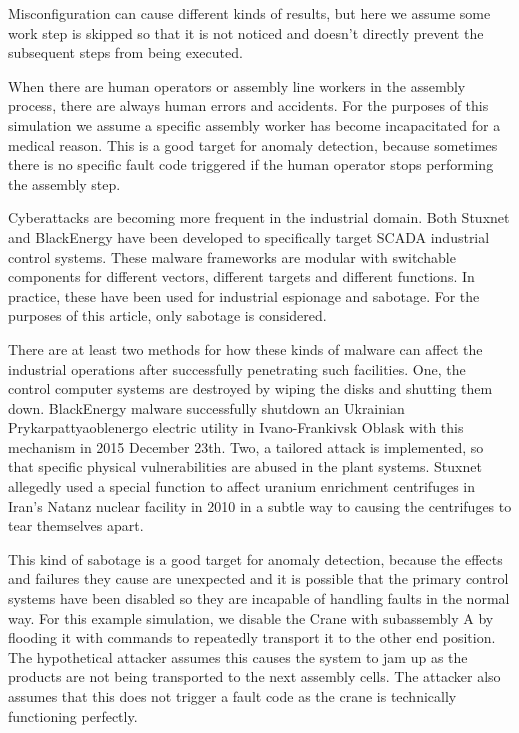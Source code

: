 \documentclass[journal]{IEEEtran}
\begin{document}
Misconfiguration can cause different kinds of results, but here we assume some work step is skipped
so that it is not noticed and doesn't directly prevent the subsequent steps from being executed. 

When there are human operators or assembly line workers in the assembly process, there are always human errors and accidents. For the purposes of this simulation we
assume a specific assembly worker has become incapacitated for a medical reason. This is a good target for anomaly detection, because sometimes there is no specific fault code
triggered if the human operator stops performing the assembly step.

Cyberattacks are becoming more frequent in the industrial domain. Both Stuxnet and BlackEnergy have been developed to specifically target SCADA industrial control systems.
These malware frameworks are modular with switchable components for different vectors, different targets and different functions.
In practice, these have been used for industrial espionage and sabotage. For the purposes of this article, only sabotage is considered.

There are at least two methods for how these kinds of malware can affect the industrial operations
after successfully penetrating such facilities. One, the control computer systems are destroyed by wiping the disks and shutting them down. BlackEnergy malware
successfully shutdown an Ukrainian Prykarpattyaoblenergo electric utility in Ivano-Frankivsk Oblask with this mechanism in 2015 December 23th.
Two, a tailored attack is implemented, so that specific physical vulnerabilities are abused in the plant systems. Stuxnet allegedly used a special function
to affect uranium enrichment centrifuges in Iran’s Natanz nuclear facility in 2010 in a subtle way to causing the centrifuges to tear themselves apart.

This kind of sabotage is a good target for anomaly detection, because the effects and failures they cause are unexpected and it is possible that the primary control systems
have been disabled so they are incapable of handling faults in the normal way. For this example simulation, we disable the Crane with subassembly A by flooding it with commands
to repeatedly transport it to the other end position. The hypothetical attacker assumes this causes the system to jam up as the products are not being transported to the next
assembly cells. The attacker also assumes that this does not trigger a fault code as the crane is technically functioning perfectly.
\end{document}
